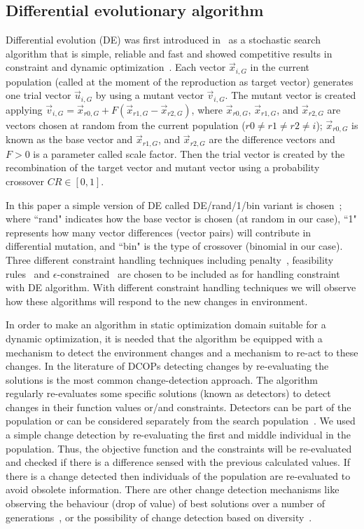 \documentclass[review]{elsarticle}
\begin{document}
\subsection{Differential evolutionary algorithm}
Differential evolution (DE) was first introduced in~\citep{storn1997differential} as a stochastic search algorithm that is simple, reliable and fast and showed competitive results in constraint and dynamic optimization~\citep{ameca2018comparison}. Each vector $\vec{x}_{i, G}$ in the current population (called at the moment of the reproduction as target vector) generates one trial vector $\vec{u}_{i, G}$ by using a mutant vector $\vec{v}_{i,G}$. The mutant vector is created applying $\vec{v}_{i,G}= \vec{x}_{r0,G} + F (\vec{x}_{r1,G} - \vec{x}_{r2,G})$,
where $\vec{x}_{r0,G}$, $\vec{x}_{r1,G}$, and $\vec{x}_{r2,G}$ are vectors chosen at random from the current population ($r0 \neq r1 \neq r2 \neq i$); $\vec{x}_{r0,G}$ is known as the base vector and $\vec{x}_{r1,G}$, and $\vec{x}_{r2,G}$ are the difference vectors and $F>0$ is a parameter called scale factor. Then the trial vector is created by the recombination of the target vector and mutant vector using a probability crossover $CR \in [0,1]$. 

In this paper a simple version of DE called DE/rand/1/bin variant is chosen~\citep{Mezura10a}; where ``rand" indicates how the base vector is chosen (at random in our case), ``1" represents  how many vector differences (vector pairs) will contribute in differential mutation, and ``bin" is the type of crossover (binomial in our case). 
Three different constraint handling techniques including penalty~\citep{tessema2009adaptive}, feasibility rules~\citep{deb2000efficient} and $\epsilon$-constrained~\citep{takahama2005constrained} are chosen to be included as for handling constraint with DE algorithm. With different constraint handling techniques we will observe how these algorithms will respond to the new changes in environment.

In order to make an algorithm in static optimization domain suitable for a dynamic optimization, it is needed that the algorithm be equipped with a mechanism to detect the environment changes and a mechanism to re-act to these changes.
In the literature of DCOPs detecting changes by re-evaluating the solutions is the most common change-detection approach. The algorithm regularly re-evaluates some specific solutions (known as detectors) to detect changes in their function values or/and constraints. Detectors can be part of the population or can be considered separately from the search population~\cite{Nguyen20121}.
We used a simple change detection by re-evaluating the first and middle individual in the population. Thus, the objective function and the constraints will be re-evaluated and checked if there is a difference sensed with the previous calculated values. If there is a change detected then individuals of the population are re-evaluated to avoid obsolete information. 
There are other change detection mechanisms like observing the behaviour (drop of value) of best solutions over a number of generations~\citep{janson2006hierarchical}, or the possibility of change detection based on diversity~\citep{richter2009detecting}. 
\end{document}
